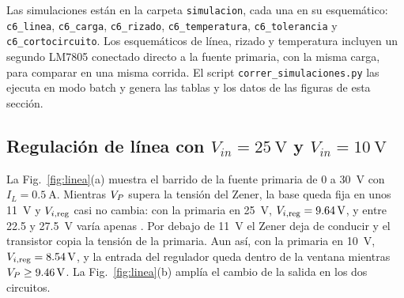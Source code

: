 Las simulaciones están en la carpeta \texttt{simulacion}, cada una en su esquemático: \texttt{c6\_linea}, \texttt{c6\_carga}, \texttt{c6\_rizado}, \texttt{c6\_temperatura}, \texttt{c6\_tolerancia} y \texttt{c6\_cortocircuito}. Los esquemáticos de línea, rizado y temperatura incluyen un segundo LM7805 conectado directo a la fuente primaria, con la misma carga, para comparar en una misma corrida. El script \texttt{correr\_simulaciones.py} las ejecuta en modo batch y genera las tablas y los datos de las figuras de esta sección.

\subsection{Regulación de línea con $V_{in} = \SI{25}{\volt}$ y $V_{in} = \SI{10}{\volt}$}
\label{sec:linea}
La Fig.~\ref{fig:linea}(a) muestra el barrido de la fuente primaria de \SI{0}{} a \SI{30}{\volt} con $I_L = \SI{0,5}{\ampere}$. Mientras $V_{P}$ supera la tensión del Zener, la base queda fija en unos \SI{11}{\volt} y $V_{i,\mathrm{reg}}$ casi no cambia: con la primaria en \SI{25}{\volt}, $\Vireg = \valu{2}{\simViregVeinticinco}{\volt}$, y entre \SI{22,5}{} y \SI{27,5}{\volt} varía apenas . Por debajo de \SI{11}{\volt} el Zener deja de conducir y el transistor copia la tensión de la primaria. Aun así, con la primaria en \SI{10}{\volt}, $\Vireg = \valu{2}{\simViregDiez}{\volt}$, y la entrada del regulador queda dentro de la ventana mientras $\Vp \geq \valu{2}{\simVpVentana}{\volt}$. La Fig.~\ref{fig:linea}(b) amplía el cambio de la salida en los dos circuitos.

